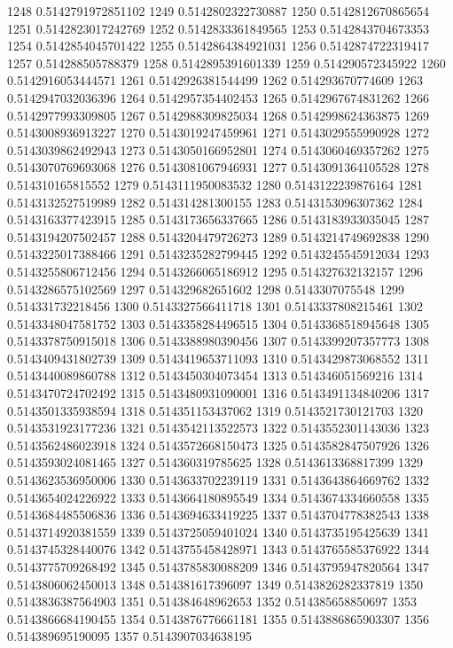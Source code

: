1248 0.5142791972851102
1249 0.5142802322730887
1250 0.5142812670865654
1251 0.5142823017242769
1252 0.5142833361849565
1253 0.5142843704673353
1254 0.5142854045701422
1255 0.5142864384921031
1256 0.5142874722319417
1257 0.514288505788379
1258 0.5142895391601339
1259 0.514290572345922
1260 0.5142916053444571
1261 0.5142926381544499
1262 0.514293670774609
1263 0.5142947032036396
1264 0.5142957354402453
1265 0.5142967674831262
1266 0.5142977993309805
1267 0.5142988309825034
1268 0.5142998624363875
1269 0.5143008936913227
1270 0.5143019247459961
1271 0.5143029555990928
1272 0.5143039862492943
1273 0.5143050166952801
1274 0.5143060469357262
1275 0.5143070769693068
1276 0.5143081067946931
1277 0.5143091364105528
1278 0.514310165815552
1279 0.5143111950083532
1280 0.5143122239876164
1281 0.5143132527519989
1282 0.514314281300155
1283 0.5143153096307362
1284 0.5143163377423915
1285 0.5143173656337665
1286 0.5143183933035045
1287 0.5143194207502457
1288 0.5143204479726273
1289 0.5143214749692838
1290 0.5143225017388466
1291 0.5143235282799445
1292 0.5143245545912034
1293 0.5143255806712456
1294 0.5143266065186912
1295 0.514327632132157
1296 0.5143286575102569
1297 0.514329682651602
1298 0.5143307075548
1299 0.514331732218456
1300 0.5143327566411718
1301 0.5143337808215461
1302 0.5143348047581752
1303 0.5143358284496515
1304 0.5143368518945648
1305 0.5143378750915018
1306 0.5143388980390456
1307 0.5143399207357773
1308 0.5143409431802739
1309 0.5143419653711093
1310 0.5143429873068552
1311 0.5143440089860788
1312 0.5143450304073454
1313 0.514346051569216
1314 0.5143470724702492
1315 0.5143480931090001
1316 0.5143491134840206
1317 0.5143501335938594
1318 0.514351153437062
1319 0.5143521730121703
1320 0.5143531923177236
1321 0.5143542113522573
1322 0.5143552301143036
1323 0.5143562486023918
1324 0.5143572668150473
1325 0.5143582847507926
1326 0.5143593024081465
1327 0.514360319785625
1328 0.5143613368817399
1329 0.5143623536950006
1330 0.5143633702239119
1331 0.5143643864669762
1332 0.5143654024226922
1333 0.5143664180895549
1334 0.5143674334660558
1335 0.5143684485506836
1336 0.5143694633419225
1337 0.5143704778382543
1338 0.5143714920381559
1339 0.5143725059401024
1340 0.5143735195425639
1341 0.5143745328440076
1342 0.5143755458428971
1343 0.5143765585376922
1344 0.5143775709268492
1345 0.5143785830088209
1346 0.5143795947820564
1347 0.5143806062450013
1348 0.514381617396097
1349 0.5143826282337819
1350 0.5143836387564903
1351 0.514384648962653
1352 0.514385658850697
1353 0.5143866684190455
1354 0.5143876776661181
1355 0.5143886865903307
1356 0.514389695190095
1357 0.5143907034638195
